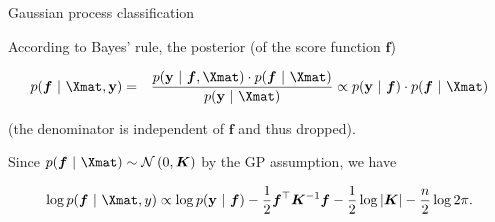 \begin{vbframe}{Gaussian process classification}
\framebreak 










According to Bayes' rule, the posterior (of the score function $\bm{f}$)

\vspace*{-0.5cm}

\begin{eqnarray*}
  p(\bm{f} ~|~ \Xmat, \ydat) &=&  \frac{p(\ydat ~|~ \bm{f}, \Xmat) \cdot p(\bm{f} ~|~ \Xmat)}{p(\ydat ~|~\Xmat)} \propto p(\ydat ~|~ \bm{f}) \cdot p(\bm{f} ~|~ \Xmat)
\end{eqnarray*}

(the denominator is independent of $\bm{f}$ and thus dropped).

\lz 

Since $p(\bm{f} ~|~ \Xmat) \sim \mathcal{N}\left(0, \bm{K}\right)$ by the GP assumption, we have

\vspace*{-0.2cm}

$$
  \log p(\bm{f} ~|~ \Xmat, y) \propto \log p(\ydat ~|~ \bm{f}) - \frac{1}{2} \bm{f}^\top \bm{K}^{-1} \bm{f} - \frac{1}{2} \log |\bm{K}| - \frac{n}{2} \log 2 \pi. 
$$


\end{vbframe}
